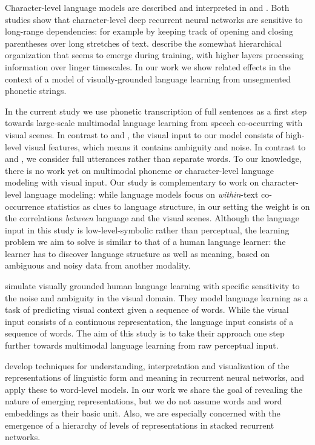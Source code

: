 Character-level language models are described and interpreted in  and . Both studies show that character-level deep recurrent neural networks are sensitive to long-range dependencies: for example by keeping track of opening and closing parentheses over long stretches of text.  describe the somewhat hierarchical organization that seems to emerge during training, with higher layers processing information over linger timescales. In our work we show related effects in the context of a model of visually-grounded language learning from unsegmented phonetic strings.

In the current study we use phonetic transcription of full sentences as a first step towards large-scale multimodal language learning from speech co-occurring with visual scenes. In contrast to  and , the visual input to our model consists of high-level visual features, which means it contains ambiguity and noise. In contrast to  and  , we consider full utterances rather than separate words. To our knowledge, there is no work yet on multimodal phoneme or character-level language modeling with visual input. Our study is complementary to work on character-level language modeling: while language models focus on {\it within}-text co-occurrence statistics as clues to language structure, in our setting the weight is on the correlations  {\it between} language and the visual scenes. Although the language input in this study is low-level-symbolic rather than perceptual, the learning problem we aim to solve is similar to that of a human language learner: the learner has to discover language structure as well as meaning, based on ambiguous and noisy data from another modality.  

 simulate visually grounded human language learning with specific sensitivity to the noise and ambiguity in the visual domain. They model language learning as a task of predicting visual context given a sequence of words. While the visual input consists of a continuous representation, the language input consists of a sequence of words. The aim of this study is to take their approach one step further towards multimodal language learning from raw perceptual input. 

 develop techniques for understanding, interpretation and visualization of the representations of linguistic form and meaning in recurrent neural networks, and apply these to word-level models. In our work we share the goal of revealing the nature of emerging representations, but we do not assume words and word embeddings as their basic unit. Also, we are especially concerned with the emergence of a hierarchy of levels of representations in stacked recurrent networks.

